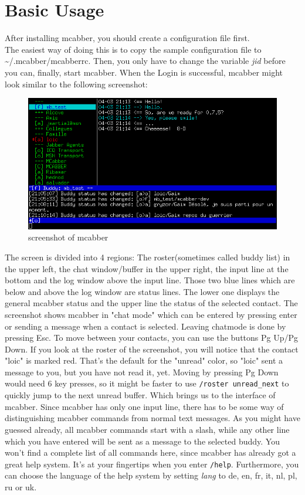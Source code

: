 \documentclass[12pt,oneside,a4]{book}
\begin{document}
\chapter{Basic Usage}
After installing mcabber, you should create a configuration file first.\\
The easiest way of doing this is to copy the sample configuration file\cite{samplerc} to
\~{}/.mcabber/mcabberrc. Then, you only have to change the variable
\textit{jid} before you can, finally, start mcabber. When the Login is
successful, mcabber might look similar to the following screenshot:\\
\begin{figure}[h!]
	\centering
	\includegraphics[scale=0.8]{guide.png}
	\caption{screenshot of mcabber}
	\label{fig:screenshot}
\end{figure}
The screen is divided into 4 regions: The roster(sometimes called buddy list) in the upper left,
the chat window/buffer in the upper right, the input line at the bottom and the log window above the
input line. Those two blue lines which are below and above the log window are status lines. The lower one
displays the general mcabber status and the upper line the status of the selected contact.
The screenshot shows mcabber in "chat mode" which can be entered by pressing enter or sending a message
when a contact is selected. Leaving chatmode is done by pressing Esc. To move between your contacts, you
can use the buttons Pg Up/Pg Down. If you look at the roster of the screenshot, you will notice that the
contact "loic" is marked red. That's the default for the "unread" color, so "loic" sent a message to
you, but you have not read it, yet. Moving by pressing Pg Down would need 6 key presses, so it might be faster to use
\verb+/roster unread_next+ to quickly jump to the next unread buffer. Which brings us to the interface of mcabber.
Since mcabber has only one input line, there has to be some way of distinguishing mcabber commands from normal text
messages. As you might have guessed already, all mcabber commands start with a slash, while any other line which you
have entered will be sent as a message to the selected buddy. You won't find a complete list of all commands here,
since mcabber has already got a great help system. It's at your fingertips when you enter \verb+/help+.
Furthermore, you can choose the language of the help system by setting \textit{lang} to de, en, fr, it, nl, pl, ru or uk.
\end{document}
